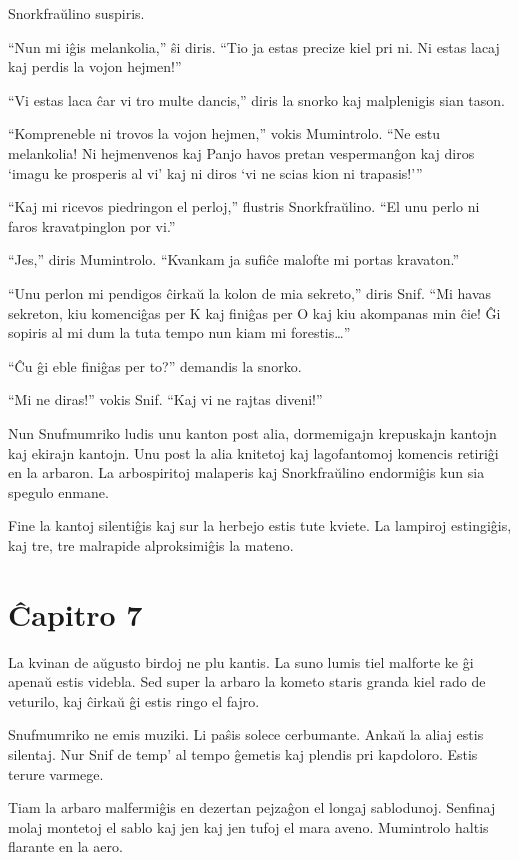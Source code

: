 Snorkfraŭlino suspiris.

``Nun mi iĝis melankolia,'' ŝi diris. ``Tio ja estas precize kiel pri ni. Ni estas lacaj kaj perdis la vojon hejmen!''

``Vi estas laca ĉar vi tro multe dancis,'' diris la snorko kaj malplenigis sian tason.

``Kompreneble ni trovos la vojon hejmen,'' vokis Mumintrolo. ``Ne estu melankolia! Ni hejmenvenos kaj Panjo havos pretan vespermanĝon kaj diros `imagu ke prosperis al vi' kaj ni diros `vi ne scias kion ni trapasis!'''

``Kaj mi ricevos piedringon el perloj,'' flustris Snorkfraŭlino. ``El unu perlo ni faros kravatpinglon por vi.''

``Jes,'' diris Mumintrolo. ``Kvankam ja sufiĉe malofte mi portas kravaton.''

``Unu perlon mi pendigos ĉirkaŭ la kolon de mia sekreto,'' diris Snif. ``Mi havas sekreton, kiu komenciĝas per K kaj finiĝas per O kaj kiu akompanas min ĉie! Ĝi sopiris al mi dum la tuta tempo nun kiam mi forestis{\ldots}''

``Ĉu ĝi eble finiĝas per to?'' demandis la snorko.

``Mi ne diras!'' vokis Snif. ``Kaj vi ne rajtas diveni!''

Nun Snufmumriko ludis unu kanton post alia, dormemigajn krepuskajn kantojn kaj ekirajn kantojn. Unu post la alia knitetoj kaj lagofantomoj komencis retiriĝi en la arbaron. La arbospiritoj malaperis kaj Snorkfraŭlino endormiĝis kun sia spegulo enmane.

Fine la kantoj silentiĝis kaj sur la herbejo estis tute kviete. La lampiroj estingiĝis, kaj tre, tre malrapide alproksimiĝis la mateno.

\chapter*[Ĉapitro 7]{Ĉapitro 7}


La kvinan de aŭgusto birdoj ne plu kantis. La suno lumis tiel malforte ke ĝi apenaŭ estis videbla. Sed super la arbaro la kometo staris granda kiel rado de veturilo, kaj ĉirkaŭ ĝi estis ringo el fajro.

Snufmumriko ne emis muziki. Li paŝis solece cerbumante. Ankaŭ la aliaj estis silentaj. Nur Snif de temp' al tempo ĝemetis kaj plendis pri kapdoloro. Estis terure varmege.

Tiam la arbaro malfermiĝis en dezertan pejzaĝon el longaj sablodunoj. Senfinaj molaj montetoj el sablo kaj jen kaj jen tufoj el mara aveno. Mumintrolo haltis flarante en la aero.


